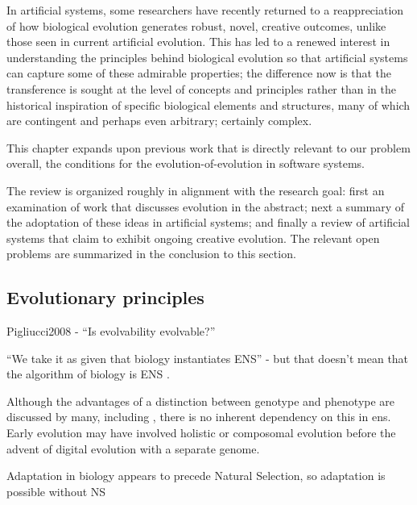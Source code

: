 In artificial systems, some researchers have recently returned to a reappreciation of how biological evolution generates robust, novel, creative outcomes, unlike those seen in current artificial evolution. This has led to a renewed interest in understanding the principles behind biological evolution so that artificial systems can capture some of these admirable properties; the difference now is that the transference is sought at the level of concepts and principles rather than in the historical inspiration of specific biological elements and structures, many of which are contingent and perhaps even arbitrary; certainly complex.

This chapter expands upon previous work that is directly relevant to our problem overall, the conditions for the evolution-of-evolution in software systems. 

The review is organized roughly in alignment with the research goal: first an examination of work that discusses evolution in the abstract; next a summary of the adoptation of these ideas in artificial systems; and finally a review of artificial systems that claim to exhibit ongoing creative evolution. The relevant open problems are summarized in the conclusion to this section.

\subsection{Evolutionary principles}

Pigliucci2008 - ``Is evolvability evolvable?''

``We take it as given that biology instantiates ENS'' - but that doesn't mean that the algorithm of biology is ENS \autocite{Watson2012}.

Although the advantages of a distinction between genotype and phenotype are discussed by many, including \autocite[section 7.2.3]{Taylor1999}, there is no inherent dependency on this in \gls{ens}. Early evolution may have involved holistic or composomal evolution before the advent of digital evolution with a separate genome.

Adaptation in biology appears to precede Natural Selection, so adaptation is possible without NS \autocite{Watson2010}	      	      	


